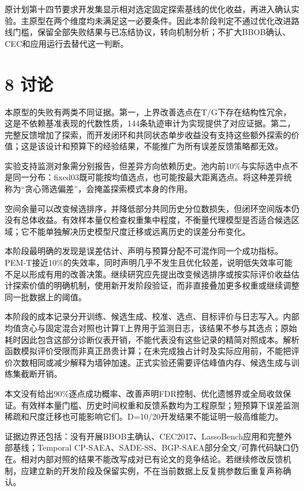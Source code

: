 \documentclass[11pt,a4paper]{article}
\begin{document}
原计划第十四节要求开发集显示相对选定固定探索基线的优化收益，再进入确认实验。主原型在两个维度均未满足这一必要条件。因此本阶段判定不通过优化改进路线门槛，保留全部失败结果与已冻结协议，转向机制分析；不扩大BBOB确认、CEC和应用运行去替代这一判断。

\hypertarget{ux8ba8ux8bba}{%
\section{8 讨论}\label{ux8ba8ux8bba}}

本原型的失败有两类不同证据。第一，上界改善选点在T/G下存在结构性冗余，这是不依赖基准表现的代数性质，144条轨迹审计为实现提供了对应证据。第二，完整反馈增加了探索，而开发闭环和共同状态单步收益没有支持这些额外探索的价值；这是该设计和预算下的经验结果，不能推广为所有误差反馈策略都无效。

实验支持监测对象需分别报告，但差异方向依赖历史。池内前10\%与实际选中点不是同一分布：fixed03既可能按均值选点，也可能按最大距离选点。将这种差异统称为``贪心筛选偏差''，会掩盖探索模式本身的作用。

空间余量可以改变候选排序，并降低部分共同历史分位数损失，但闭环空间版本仍没有总体收益。有效样本量仅检查权重集中程度，不衡量代理模型是否适合候选区域；它不能单独解决历史模型尺度迁移或远离历史的误差分布变化。

本阶段最明确的发现是误差估计、声明与预算分配不可混作同一个成功指标。PEM-T接近10\%的失效率，同时声明几乎不发生且优化较差，说明低失效率可能不足以形成有用的改善决策。继续研究应先提出改变候选排序或按实际评价收益估计探索价值的明确机制，使用新开发阶段验证，而非直接叠加更多权重或继续调整同一批数据上的阈值。

本阶段的成本记录分开训练、候选生成、校准、选点、目标评价与日志写入。内部均值贪心与固定混合对照也计算T上界用于监测日志，该结果不参与其选点；原始耗时因此包含这部分诊断仪表开销，不能代表没有这些记录的精简对照成本。解析函数模拟评价受限而非真正昂贵计算；在未完成独占计时及实际应用前，不能把评价次数相同或减少解释为墙钟加速。正式实验还需要评估峰值内存、候选生成与训练集截断开销。

本文没有给出90\%逐点成功概率、改善声明FDR控制、优化遗憾界或全局收敛保证。有效样本量门槛、历史时间权重和反馈系数均为工程原型；短预算下误差监测稀疏和尺度迁移也可能影响它们。D=10/20开发结果不能证明一般高维能力。

证据边界还包括：没有开展BBOB主确认、CEC2017、LassoBench应用和完整外部基线；Temporal
CP-SAEA、SADE-SS、BGP-SAEA部分全文/可靠代码缺口仍在。相对内部对照的结果不能改写成对已有论文的竞争结论。若继续修改反馈机制，应建立新的开发阶段及保留实例，不在当前数据上反复挑参数后重复声称确认。
\end{document}
